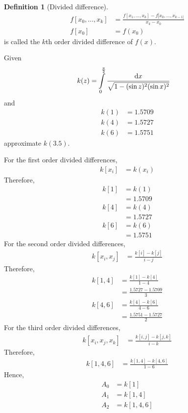\documentclass[fleqn, a4paper, 12pt, twoside]{article}
\theoremstyle{definition}
\newtheorem{definition}{Definition}
\theoremstyle{theorem}
\begin{document}
\begin{definition}[Divided difference]
	\begin{align*}
		f[x_0,\dots,x_k] & = \frac{f[x_1,\dots,x_k] - f[x_0,\dots,x_{k - 1]}}{x_k - x_0} \\
		f[x_0]           & = f(x_0)
	\end{align*}
	is called the $k$th order divided difference of $f(x)$.
\end{definition}

\begin{question}
	Given
	\begin{align*}
		k(z) & = \int\limits_{0}^{\frac{\pi}{2}} \frac{\dif x}{\sqrt{1 - (\sin z)^2 (\sin x)^2}}
	\end{align*}
	and
	\begin{align*}
		k(1) & = 1.5709 \\
		k(4) & = 1.5727 \\
		k(6) & = 1.5751
	\end{align*}
	approximate $k(3.5)$.
\end{question}

\begin{solution}
	For the first order divided differences,
	\begin{align*}
		k[x_i] & = k(x_i)
	\end{align*}
	Therefore,
	\begin{align*}
		k[1] & = k(1)   \\
                     & = 1.5709 \\
		k[4] & = k(4)   \\
                     & = 1.5727 \\
		k[6] & = k(6)   \\
                     & = 1.5751
	\end{align*}
	For the second order divided differences,
	\begin{align*}
		k[x_i,x_j] & = \frac{k[i] - k[j]}{i - j}
	\end{align*}
	Therefore,
	\begin{align*}
		k[1,4] & = \frac{k[1] - k[4]}{1 - 4} \\
                       & = \frac{1.5727 - 1.5709}{3} \\
		k[4,6] & = \frac{k[4] - k[6]}{4 - 6} \\
                       & = \frac{1.5751 - 1.5727}{2}
	\end{align*}
	For the third order divided differences,
	\begin{align*}
		k[x_i,x_j,x_k] & = \frac{k[i,j] - k[j,k]}{i - k}
	\end{align*}
	Therefore,
	\begin{align*}
		k[1,4,6] & = \frac{k[1,4] - k[4,6]}{1 - 6}
	\end{align*}
	Hence,
	\begin{align*}
		A_0 & = k[1]   \\
		A_1 & = k[1,4] \\
		A_2 & = k[1,4,6]
	\end{align*}
\end{solution}
\end{document}
